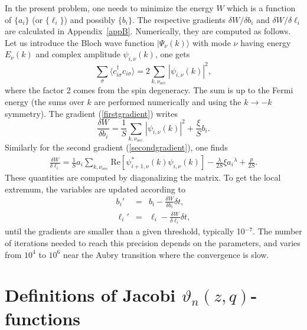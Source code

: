 \documentclass[]{revtex4-1}
\begin{document}
In the present problem, one needs to minimize the energy $W$ which is a function of $\{a_i\}$ (or $\{\ell_i \}$) and possibly $\{b_i\}$. The respective gradients $\delta W/\delta b_i$ and $\delta W/\delta \ell_i$ are calculated in Appendix~\ref{appB}. Numerically, they are computed as follows.
Let us introduce the Bloch wave function $\vert \Psi_{\nu}(k) \rangle$ with mode $\nu$ having energy $E_{\nu}(k)$ and complex amplitude $\psi_{i,\nu}(k)$, one gets
\begin{equation}
 \sum_{\sigma}\langle c_{i\sigma}^{\dagger} c_{i\sigma} \rangle= 2 \sum_{k,\nu_{occ.}} |\psi_{i,\nu}(k)|^2,
\end{equation}
where the factor 2 comes from the spin degeneracy. The sum is up to the Fermi energy (the sums over $k$ are performed numerically and using the $k \rightarrow -k$ symmetry). The gradient (\ref{firstgradient}) writes
\begin{equation}
\frac{\delta W}{\delta b_i}=  \frac{1}{S}  \sum_{k,\nu_{occ.}} |\psi_{i,\nu}(k)|^2 +   \frac{\xi}{S}  b_i .
\end{equation}
Similarly for the second gradient (\ref{secondgradient}), one finds
\begin{eqnarray}
  \frac{\delta W}{\delta \ell_i}=  \frac{1}{S} a_i   \sum_{k,\nu_{occ.}} \mbox{Re}[\psi_{i+1,\nu}^*(k) \psi_{i,\nu}(k)] - \frac{\lambda}{2S} \xi {a_i}^{\lambda}  + \frac{p}{2S}.
\end{eqnarray}
These quantities are computed by diagonalizing the matrix.
To get the local extremum, the variables are updated according to
\begin{eqnarray}
b_i' &= &b_i-\frac{\delta W}{\delta b_i} \delta t, \\
\ell_i' &=& \ell_i-\frac{\delta W}{\delta \ell_i} \delta t,
\end{eqnarray}
until the gradients are smaller than a given threshold, typically 10$^{-7}$. The number of iterations needed to reach this precision depends on the parameters, and varies from $10^4$ to $10^6$ near the Aubry transition where the convergence is slow.


 \section{Definitions of Jacobi $\vartheta_n(z,q)$-functions}
 \label{appAp}
\end{document}
